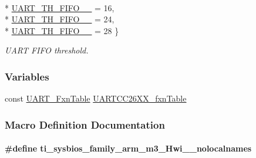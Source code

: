 \begin{DoxyCompactItemize}
\\*
\hyperlink{_u_a_r_t_c_c26_x_x_8h_a292a5e751577698b215f5e8aa1c79e99ae34abfc239ba6e60a1aca5d6819b4a18}{U\+A\+R\+T\+\_\+\+T\+H\+\_\+\+F\+I\+F\+O\+\_\+\_} = 16, 
\\*
\hyperlink{_u_a_r_t_c_c26_x_x_8h_a292a5e751577698b215f5e8aa1c79e99a43dc712fd0f011504b0b4492981bd0fd}{U\+A\+R\+T\+\_\+\+T\+H\+\_\+\+F\+I\+F\+O\+\_\+\_} = 24, 
\\*
\hyperlink{_u_a_r_t_c_c26_x_x_8h_a292a5e751577698b215f5e8aa1c79e99a5626e06eacec74562c303427dd33a95b}{U\+A\+R\+T\+\_\+\+T\+H\+\_\+\+F\+I\+F\+O\+\_\+\_} = 28
 \}
\begin{DoxyCompactList}\small\item\em U\+A\+R\+T F\+I\+F\+O threshold. \end{DoxyCompactList}\end{DoxyCompactItemize}
\subsubsection*{Variables}
\begin{DoxyCompactItemize}
\item 
const \hyperlink{struct_u_a_r_t___fxn_table}{U\+A\+R\+T\+\_\+\+Fxn\+Table} \hyperlink{_u_a_r_t_c_c26_x_x_8h_abd5f1691efe38764c7ef10750e407e5e}{U\+A\+R\+T\+C\+C26\+X\+X\+\_\+fxn\+Table}
\end{DoxyCompactItemize}


\subsubsection{Macro Definition Documentation}
\paragraph[{ti\+\_\+sysbios\+\_\+family\+\_\+arm\+\_\+m3\+\_\+\+Hwi\+\_\+\+\_\+nolocalnames}]{\setlength{\rightskip}{0pt plus 5cm}\#define ti\+\_\+sysbios\+\_\+family\+\_\+arm\+\_\+m3\+\_\+\+Hwi\+\_\+\+\_\+nolocalnames}\label{_u_a_r_t_c_c26_x_x_8h_aaa17ecf48f5762e2e1bdb0bab8aacf0c}
